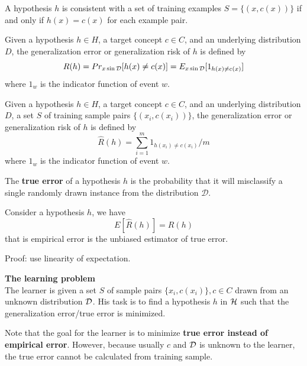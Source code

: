 \begin{refsection}
\begin{definition}
A hypothesis $h$ is consistent with a set of training examples $S=\{(x,c(x))\}$ if and only if $h(x) = c(x)$ for each example pair.
\end{definition}


\begin{definition}
Given a hypothesis $h\in H$, a target concept $c\in C$, and an underlying distribution $D$, the generalization error or generalization risk of $h$ is defined by
$$R(h) = Pr_{x\sin \mathcal{D}}[h(x)\neq c(x)] = E_{x\sin \mathcal{D}}[1_{h(x)\neq c(x)}]$$
where $1_w$ is the indicator function of event $w$.
\end{definition}


\begin{definition}
Given a hypothesis $h\in H$, a target concept $c\in C$, and an underlying distribution $D$, a set $S$ of training sample pairs $\{(x_i,c(x_i))\}$, the generalization error or generalization risk of $h$ is defined by
$$\hat{R}(h) = \sum_{i=1}^m 1_{h(x_i)\neq c(x_i)}/m$$
where $1_w$ is the indicator function of event $w$.
\end{definition}

\begin{remark}
The \textbf{true error} of a hypothesis $h$ is the probability that it will misclassify a single randomly drawn instance from the distribution $\mathcal{D}$.
\end{remark}

\begin{lemma}
Consider a hypothesis $h$, we have
$$E[\hat{R}(h)] = R(h)$$
that is empirical error is the unbiased estimator of true error.
\end{lemma}
Proof: use linearity of expectation.


\begin{mdframed}
\textbf{\large The learning problem}\cite[12]{mohri2012foundations}\\

The learner is given a set $S$ of sample pairs $\{x_i,c(x_i)\}, c\in C$ drawn from an unknown distribution $\mathcal{D}$. His task is to find a hypothesis $h$ in $\mathcal{H}$ such that the generalization error/true error is minimized.
\end{mdframed}

\begin{remark}
Note that the goal for the learner is to minimize \textbf{true error instead of empirical error}. However, because usually $c$ and $\mathcal{D}$ is unknown to the learner, the true error cannot be calculated from training sample. 
\end{remark}



\end{refsection}
